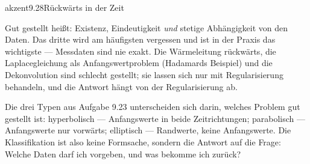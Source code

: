 \begin{loesungkarte}{akzent}{9.28}{Rückwärts in der Zeit}
\begin{fehler}\kastentext
Gut gestellt heißt: Existenz, Eindeutigkeit \emph{und} stetige Abhängigkeit von den Daten. Das dritte wird am häufigsten vergessen und ist in der Praxis das wichtigste --- Messdaten sind nie exakt. Die Wärmeleitung rückwärts, die Laplacegleichung als Anfangswertproblem (Hadamards Beispiel) und die Dekonvolution sind schlecht gestellt; sie lassen sich nur mit Regularisierung behandeln, und die Antwort hängt von der Regularisierung ab.
\end{fehler}
\begin{mitnehmen}\kastentext
Die drei Typen aus Aufgabe 9.23 unterscheiden sich darin, welches Problem gut gestellt ist: hyperbolisch --- Anfangswerte in beide Zeitrichtungen; parabolisch --- Anfangswerte nur vorwärts; elliptisch --- Randwerte, keine Anfangswerte. Die Klassifikation ist also keine Formsache, sondern die Antwort auf die Frage: Welche Daten darf ich vorgeben, und was bekomme ich zurück?
\end{mitnehmen}
\end{loesungkarte}

